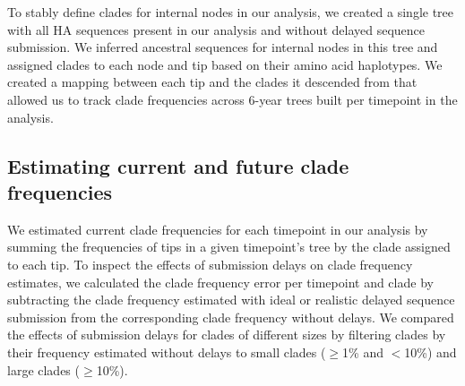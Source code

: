 \documentclass[9pt,lineno]{elife}
\begin{document}
To stably define clades for internal nodes in our analysis, we created a single tree with all HA sequences present in our analysis and without delayed sequence submission.
We inferred ancestral sequences for internal nodes in this tree and assigned clades to each node and tip based on their amino acid haplotypes.
We created a mapping between each tip and the clades it descended from that allowed us to track clade frequencies across 6-year trees built per timepoint in the analysis.

\subsection{Estimating current and future clade frequencies}

We estimated current clade frequencies for each timepoint in our analysis by summing the frequencies of tips in a given timepoint's tree by the clade assigned to each tip.
To inspect the effects of submission delays on clade frequency estimates, we calculated the clade frequency error per timepoint and clade by subtracting the clade frequency estimated with ideal or realistic delayed sequence submission from the corresponding clade frequency without delays.
We compared the effects of submission delays for clades of different sizes by filtering clades by their frequency estimated without delays to small clades ($\ge$1\% and $<$10\%) and large clades ($\ge$10\%).
\end{document}
